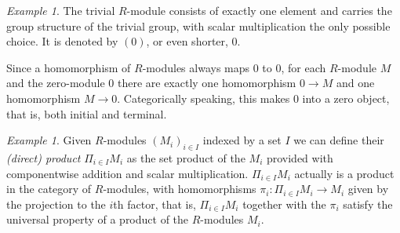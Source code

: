 \documentclass{amsart}
\theoremstyle{plain}
\numberwithin{equation}{section} %
\numberwithin{figure}{section} %
\theoremstyle{plain}
\theoremstyle{plain}
\theoremstyle{plain}
\theoremstyle{plain}
\theoremstyle{plain}
\theoremstyle{plain}
\theoremstyle{remark}
\theoremstyle{remark}
\theoremstyle{remark}
\newtheorem{exm}[thm]{Example}
\begin{document}
\begin{exm}
The trivial $R$-module consists of exactly one element and carries the group structure of the trivial group, with scalar multiplication the only possible choice. It is denoted by $(0)$, or even shorter, $0$. 

Since a homomorphism of $R$-modules always maps $0$ to $0$, for each $R$-module $M$ and the zero-module $0$ there are exactly one homomorphism $0 \rightarrow M$ and one homomorphism $M \rightarrow 0$. Categorically speaking, this makes $0$ into a zero object, that is, both initial and terminal. 
\end{exm}

\begin{exm} \label{direct-prod-ex}
Given $R$-modules $(M_i)_{i \in I}$ indexed by a set $I$ we can define their \textit{(direct) product} $\Pi_{i \in I} M_i$ as the set product of the $M_i$ provided with componentwise addition and scalar multiplication.
$\Pi_{i \in I} M_i$ actually is a product in the category of $R$-modules, with homomorphisms $\pi_i : \Pi_{i \in I} M_i \rightarrow M_i$ given by the projection to the $i$th factor, that is, $\Pi_{i \in I} M_i$ together with the $\pi_i$ satisfy the universal property of a product of the $R$-modules $M_i$. 
\end{exm}
\end{document}

